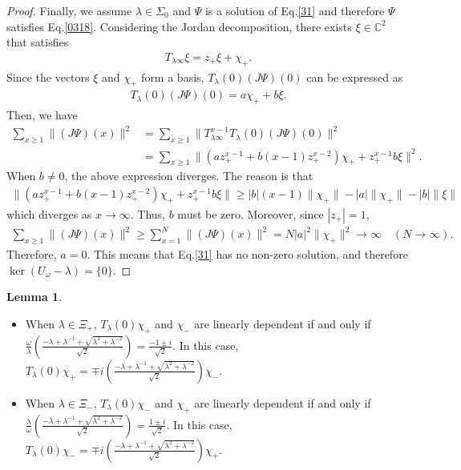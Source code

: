 \documentclass[a4paper,12pt]{article}
\theoremstyle{plain}
\theoremstyle{definition}
\newtheorem{lemma}[thm]{Lemma}
\theoremstyle{definition}
\begin{document}
\begin{proof}
Finally, we assume $\lambda \in \Sigma_0$ and $\Psi$ is a solution of Eq.\eqref{31} and therefore $\Psi$ satisfies Eq.\eqref{0318}. Considering the Jordan decomposition, there exists $\xi \in \mathbb{C}^2$ that satisfies
\begin{align*}
    T_{\lambda \infty}\xi = z_+ \xi +\chi_+.
\end{align*}
Since the vectors $\xi$ and $\chi_+$ form a basis, $T_{\lambda}(0)(J\Psi)(0)$ can be expressed as
\begin{align*}
    T_{\lambda}(0)(J\Psi)(0)=a\chi_+ +b\xi.
\end{align*}
Then, we have
\begin{align*}
    \sum_{x \geq 1}\|(J\Psi)(x) \|^2 &= \sum_{x \geq 1}\|T_{\lambda \infty}^{x-1}T_{\lambda}(0)(J\Psi)(0) \|^2 \\
    &= \sum_{x \geq 1} \|(az_{+}^{x-1}+b(x-1)z_{+}^{x-2})\chi_{+} +z_{+}^{x-1}b\xi \|^2. 
\end{align*}
When $b \neq 0$, the above expression diverges. The reason is that
\begin{align*}
\|(az_{+}^{x-1}+b(x-1)z_{+}^{x-2})\chi_{+} + z_{+}^{x-1}b\xi \| \geq |b|(x-1)\|\chi_+ \| - |a|\|\chi_+ \| - |b|\|\xi \|
\end{align*}
which diverges as $x \to \infty$. Thus, $b$ must be zero. Moreover, since $|z_+|=1$, 
\begin{align*}
   \sum_{x \geq 1}\|(J\Psi)(x) \|^2 \ge \sum_{x=1}^N\|(J\Psi)(x) \|^2 = N |a|^2\|\chi_+\|^2 \to \infty \quad (N\to \infty).
\end{align*}
Therefore, $a=0$. This means that Eq.\eqref{31} has no non-zero solution, and therefore $\ker(U_{\omega}-\lambda) =\{0\}$.
\end{proof}

\begin{lemma}\label{lemma34}
\begin{itemize}
\item[(i)]When $\lambda \in \Xi_{+}$, $T_{\lambda}(0)\chi _{+}$ and $\chi_{-}$ are linearly dependent if and only if $\frac{\omega}{\lambda}(\frac{-\lambda +\lambda^{-1}+\sqrt{\lambda^2+\lambda^{-2}}}{\sqrt{2}})=\frac{-1\pm i}{\sqrt{2}}$.
In this case, $T_\lambda(0)\chi_+=  \mp i \left(\frac{-\lambda +\lambda^{-1}+\sqrt{\lambda^2+\lambda^{-2}}}{\sqrt{2}}\right)\chi_-$.
\item[(ii)]When $\lambda \in \Xi _{-}$, $T_{\lambda}(0)\chi _{-}$ and $\chi_{+}$ are linearly dependent if and only if $\frac{\lambda}{\omega}(\frac{-\lambda +\lambda^{-1}+\sqrt{\lambda^2 +\lambda^{-2}}}{\sqrt{2}})=\frac{1\pm i}{\sqrt{2}}$.
In this case, $T_\lambda(0)\chi_-=  \mp i \left(\frac{-\lambda +\lambda^{-1}+\sqrt{\lambda^2+\lambda^{-2}}}{\sqrt{2}}\right) \chi_+$.
\end{itemize}
\end{lemma}
\end{document}
